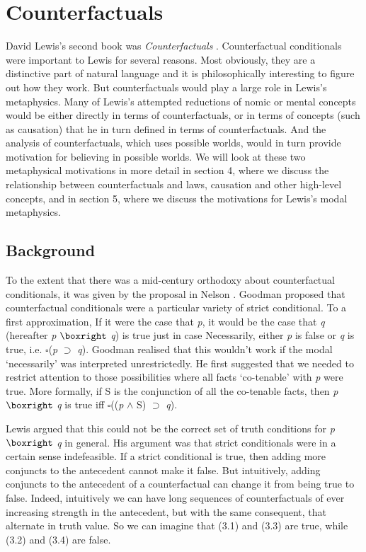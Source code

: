 \section{Counterfactuals}
David Lewis's second book was \textit{Counterfactuals} \citeyearpar{Lewis1973a}. Counterfactual conditionals were important to Lewis for several reasons. Most obviously, they are a distinctive part of natural language and it is philosophically interesting to figure out how they work. But counterfactuals would play a large role in Lewis's metaphysics. Many of Lewis's attempted reductions of nomic or mental concepts would be either directly in terms of counterfactuals, or in terms of concepts (such as causation) that he in turn defined in terms of counterfactuals. And the analysis of counterfactuals, which uses possible worlds, would in turn provide motivation for believing in possible worlds. We will look at these two metaphysical motivations in more detail in section 4, where we discuss the relationship between counterfactuals and laws, causation and other high-level concepts, and in section 5, where we discuss the motivations for Lewis's modal metaphysics.

\subsection{Background} 
To the extent that there was a mid-century orthodoxy about counterfactual conditionals, it was given by the proposal in Nelson \citet{Goodman1955}. Goodman proposed that counterfactual conditionals were a particular variety of strict conditional. To a first approximation, If it were the case that \textit{p}, it would be the case that \textit{q} (hereafter \textit{p} \(\boxright\) \textit{q}) is true just in case Necessarily, either \textit{p} is false or \textit{q} is true, i.e. \(\square\)(\textit{p} \(\supset\) \textit{q}). Goodman realised that this wouldn't work if the modal `necessarily' was interpreted unrestrictedly. He first suggested that we needed to restrict attention to those possibilities where all facts `co-tenable' with \textit{p} were true. More formally, if S is the conjunction of all the co-tenable facts, then \textit{p} \(\boxright\) \textit{q} is true iff \(\square\)((\textit{p} \(\wedge\) S) \(\supset\) \textit{q}).

Lewis argued that this could not be the correct set of truth conditions for \textit{p} \(\boxright\) \textit{q} in general. His argument was that strict conditionals were in a certain sense indefeasible. If a strict conditional is true, then adding more conjuncts to the antecedent cannot make it false. But intuitively, adding conjuncts to the antecedent of a counterfactual can change it from being true to false. Indeed, intuitively we can have long sequences of counterfactuals of ever increasing strength in the antecedent, but with the same consequent, that alternate in truth value. So we can imagine that (3.1) and (3.3) are true, while (3.2) and (3.4) are false.

